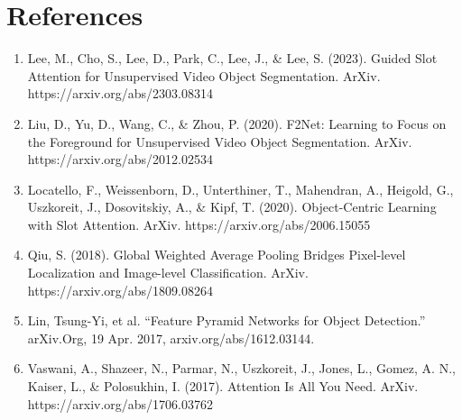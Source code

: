 \documentclass{article}
\theoremstyle{plain}
\theoremstyle{definition}
\theoremstyle{remark}
\begin{document}
\section*{References}
\renewcommand{\labelenumi}{[\arabic{enumi}]}

\begin{enumerate}
\item Lee, M., Cho, S., Lee, D., Park, C., Lee, J., \& Lee, S. (2023). Guided Slot Attention for Unsupervised Video Object Segmentation. ArXiv. https://arxiv.org/abs/2303.08314

\item Liu, D., Yu, D., Wang, C., \& Zhou, P. (2020). F2Net: Learning to Focus on the Foreground for Unsupervised Video Object Segmentation. ArXiv. https://arxiv.org/abs/2012.02534

\item Locatello, F., Weissenborn, D., Unterthiner, T., Mahendran, A., Heigold, G., Uszkoreit, J., Dosovitskiy, A., \& Kipf, T. (2020). Object-Centric Learning with Slot Attention. ArXiv. https://arxiv.org/abs/2006.15055

\item Qiu, S. (2018). Global Weighted Average Pooling Bridges Pixel-level Localization and Image-level Classification. ArXiv. https://arxiv.org/abs/1809.08264

\item Lin, Tsung-Yi, et al. “Feature Pyramid Networks for Object Detection.” arXiv.Org, 19 Apr. 2017, arxiv.org/abs/1612.03144.

\item Vaswani, A., Shazeer, N., Parmar, N., Uszkoreit, J., Jones, L., Gomez, A. N., Kaiser, L., & Polosukhin, I. (2017). Attention Is All You Need. ArXiv. https://arxiv.org/abs/1706.03762
\end{enumerate}
\end{document}
